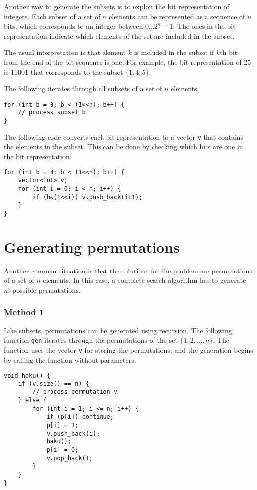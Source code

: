 Another way to generate the subsets is to exploit
the bit representation of integers.
Each subset of a set of $n$ elements
can be represented as a sequence of $n$ bits,
which corresponds to an integer between $0 \ldots 2^n-1$.
The ones in the bit representation indicate
which elements of the set are included in the subset.

The usual interpretation is that element $k$
is included in the subset if $k$th bit from the
end of the bit sequence is one.
For example, the bit representation of 25
is 11001 that corresponds to the subset $\{1,4,5\}$.

The following iterates through all subsets
of a set of $n$ elements

\begin{lstlisting}
for (int b = 0; b < (1<<n); b++) {
    // process subset b
}
\end{lstlisting}

The following code converts each bit
representation to a vector \texttt{v}
that contains the elements in the subset.
This can be done by checking which bits
are one in the bit representation.

\begin{lstlisting}
for (int b = 0; b < (1<<n); b++) {
    vector<int> v;
    for (int i = 0; i < n; i++) {
        if (b&(1<<i)) v.push_back(i+1);
    }
}
\end{lstlisting}

\section{Generating permutations}


Another common situation is that the solutions
for the problem are permutations of a
set of $n$ elements.
In this case, a complete search algorithm has to
generate $n!$ possible permutations.

\subsubsection{Method 1}

Like subsets, permutations can be generated
using recursion.
The following function \texttt{gen} iterates
through the permutations of the set $\{1,2,\ldots,n\}$.
The function uses the vector \texttt{v}
for storing the permutations, and the generation
begins by calling the function without parameters.

\begin{lstlisting}
void haku() {
    if (v.size() == n) {
        // process permutation v
    } else {
        for (int i = 1; i <= n; i++) {
            if (p[i]) continue;
            p[i] = 1;
            v.push_back(i);
            haku();
            p[i] = 0;
            v.pop_back();
        }
    }
}
\end{lstlisting}

